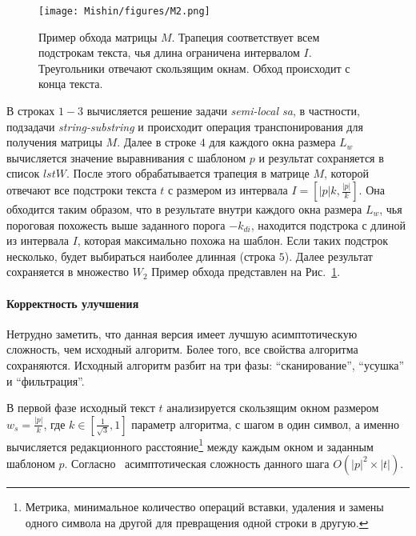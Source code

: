 \begin{figure}[t!]
\centering
    \texttt{[image: Mishin/figures/M2.png]}
    \caption{Пример обхода матрицы $M$. Трапеция соответствует всем подстрокам текста, чья длина ограничена интервалом $I$. Треугольники отвечают скользящим окнам.
    Обход происходит с конца текста.
    }\label{passage}
\end{figure}

В строках $1-3$ вычисляется решение задачи \emph{semi-local sa}, в частности, подзадачи \emph{string-substring} и происходит операция транспонирования для получения матрицы $M$.
Далее в строке $4$ для каждого окна размера $L_{w}$ вычисляется значение выравнивания с 
шаблоном $p$  и результат сохраняется в список $lstW$.
После этого обрабатывается трапеция в матрице $M$, которой отвечают все
подстроки текста $t$ с размером из интервала $I=[|p|k,\frac{|p|}{k}]$.
Она обходится таким образом, что в результате внутри каждого окна размера $L_{w}$,
чья пороговая похожесть выше заданного порога $-k_{di}$, находится подстрока с длиной из  интервала $I$, которая максимально похожа на шаблон. Если таких подстрок несколько, будет выбираться наиболее длинная (строка $5$).
Далее результат сохраняется в множество $W_{2}$
Пример обхода представлен на Рис.~\ref{passage}.

\paragraph*{Корректность улучшения}\mbox{}

Нетрудно заметить, что данная версия имеет лучшую асимптотическую сложность, чем исходный алгоритм. Более того, все свойства алгоритма сохраняются.
Исходный алгоритм разбит на три фазы: ``сканирование'', ``усушка'' и ``фильтрация''.

В первой фазе исходный текст $t$ анализируется скользящим окном размером $w_{s} = \frac{|p|}{k}$, где $k \in [\frac{1}{\sqrt{3}},1]$ параметр алгоритма, с шагом в один символ, а именно вычисляется редакционного расстояние\footnote{Метрика, минимальное количество операций вставки, удаления и замены одного символа на другой для превращения одной строки в другую.} между каждым окном и заданным шаблоном $p$.
Согласно~\cite{luciv2019interactive} асимптотическая сложность данного шага $O(|p|^2 \times |t|)$.

